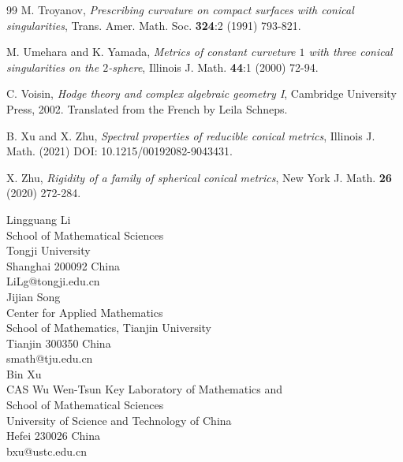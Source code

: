 \documentclass[12pt]{article}
\begin{document}
\begin{thebibliography}{99}
   M. Troyanov, \emph{Prescribing curvature on compact surfaces with conical singularities}, Trans. Amer. Math. Soc. {\bf 324}:2 (1991) 793-821.

   M. Umehara and K. Yamada, \emph{Metrics of constant curveture $1$ with three conical singularities on the $2$-sphere}, Illinois J. Math. {\bf 44}:1 (2000) 72-94.

   C. Voisin, \emph{Hodge theory and complex algebraic geometry I}, Cambridge University Press, 2002. Translated from the French by Leila Schneps.

   B. Xu and X. Zhu, \emph{Spectral properties of reducible conical metrics}, Illinois J. Math. (2021) DOI: 10.1215/00192082-9043431.

   X. Zhu, \emph{Rigidity of a family of spherical conical metrics}, New York J. Math. {\bf 26} (2020) 272-284.


\end{thebibliography}
\vspace{0.5cm}

{\sc \noindent Lingguang Li\\
School of Mathematical Sciences\\
Tongji University\\
Shanghai 200092 China}\\
LiLg@tongji.edu.cn\\


{\small {\sc  \noindent Jijian Song\\
Center for Applied Mathematics\\
School of Mathematics, Tianjin University\\
Tianjin 300350 China}\\
\Envelope smath@tju.edu.cn\\


{\sc \noindent Bin Xu\\
CAS Wu Wen-Tsun Key Laboratory of Mathematics and\\
School of Mathematical Sciences\\
University of Science and Technology of China\\
Hefei 230026 China}\\
bxu@ustc.edu.cn}
\end{document}

